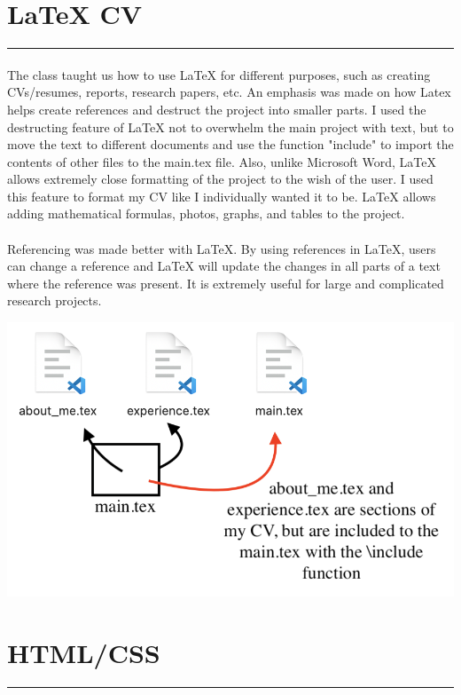 \documentclass[a4paper,11pt]{article}
\newcommand{\sectitle}[1]{
    \vspace{1.5ex}
    \section{#1}
    \vspace{-3ex}
    \noindent\rule{\textwidth}{0.7pt}
    \vspace{-4ex}
}
\begin{document}

\sectitle{LaTeX CV}

\paragraph{}
The class taught us how to use LaTeX for different purposes, such as creating CVs/resumes, reports, research papers, etc. An emphasis was made on how Latex helps create references and destruct the project into smaller parts. I used the destructing feature of LaTeX not to overwhelm the main project with text, but to move the text to different documents and use the function "include" to import the contents of other files to the main.tex file. Also, unlike Microsoft Word, LaTeX allows extremely close formatting of the project to the wish of the user. I used this feature to format my CV like I individually wanted it to be. LaTeX allows adding mathematical formulas, photos, graphs, and tables to the project.

\paragraph{}
Referencing was made better with LaTeX. By using references in LaTeX, users can change a reference and LaTeX will update the changes in all parts of a text where the reference was present. It is extremely useful for large and complicated research projects.

\begin{center}
\includegraphics[scale=0.65]{latex.png}
\end{center}

\sectitle{HTML/CSS}
\end{document}
